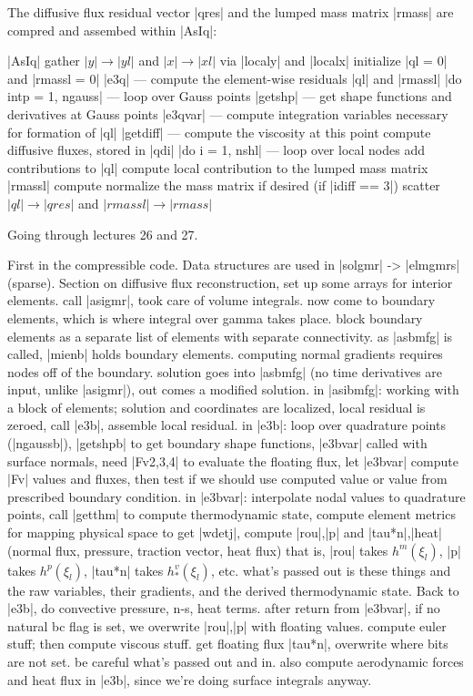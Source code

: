 \documentclass[11pt]{article}
\begin{document}
The diffusive flux residual vector |qres| and the lumped mass matrix |rmass| are compred and assembed within |AsIq|:
\begin{outline}[deep]
\1 |AsIq|
	\2 gather $|y| \rightarrow |yl|$ and $|x| \rightarrow |xl|$ via |localy| and |localx|
	\2 initialize |ql = 0| and |rmassl = 0|
	\2 |e3q| --- compute the element-wise residuals |ql| and |rmassl|
		\3 |do intp = 1, ngauss| --- loop over Gauss points
			\4 |getshp| --- get shape functions and derivatives at Gauss points
			\4 |e3qvar| --- compute integration variables necessary for formation of |ql|
				\5 
			\4 |getdiff| --- compute the viscosity at this point
			\4 compute diffusive fluxes, stored in |qdi|
			\4 |do i = 1, nshl| --- loop over local nodes
				\5 add contributions to |ql|
			\4 compute local contribution to the lumped mass matrix |rmassl|
			\4 compute 
		\3 normalize the mass matrix if desired (if |idiff == 3|)
	\2 scatter $|ql| \rightarrow |qres|$ and $|rmassl| \rightarrow |rmass|$
\end{outline}

Going through lectures 26 and 27.

First in the compressible code.
Data structures are used in |solgmr| -> |elmgmrs| (sparse). Section on diffusive flux reconstruction, set up some arrays for interior elements. call |asigmr|, took care of volume integrals. now come to boundary elements, which is where integral over gamma takes place. block boundary elements as a separate list of elements with separate connectivity. as |asbmfg| is called, |mienb| holds boundary elements. computing normal gradients requires nodes off of the boundary. solution goes into |asbmfg| (no time derivatives are input, unlike |asigmr|), out comes a modified solution. in |asibmfg|: working with a block of elements; solution and coordinates are localized, local residual is zeroed, call |e3b|, assemble local residual. in |e3b|: loop over quadrature points (|ngaussb|), |getshpb| to get boundary shape functions, |e3bvar| called with surface normals, need |Fv{2,3,4}| to evaluate the floating flux, let |e3bvar| compute |Fv| values and fluxes, then test if we should use computed value or value from prescribed boundary condition. in |e3bvar|: interpolate nodal values to quadrature points, call |getthm| to compute thermodynamic state, compute element metrics for mapping physical space to get |wdetj|, compute |rou|,|p| and |tau*n|,|heat| (normal flux, pressure, traction vector, heat flux) that is, |rou| takes $h^m(\xi_l)$, |p| takes $h^p(\xi_l)$, |tau*n| takes $h^v_*(\xi_l)$, etc. what's passed out is these things and the raw variables, their gradients, and the derived thermodynamic state. Back to |e3b|, do convective pressure, n-s, heat terms. after return from |e3bvar|, if no natural bc flag is set, we overwrite |rou|,|p| with floating values. compute euler stuff; then compute viscous stuff. get floating flux |tau*n|, overwrite where bits are not set. be careful what's passed out and in. also compute aerodynamic forces and heat flux in |e3b|, since we're doing surface integrals anyway.
\end{document}
